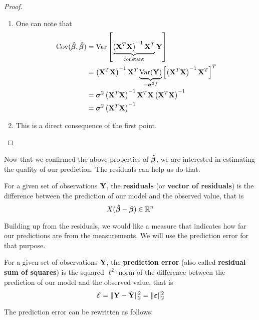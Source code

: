 \begin{proof}
    \begin{enumerate}[label=(\roman*)]

        \item One can note that\begin{align*}
                  \operatorname{Cov}(\boldsymbol{\hat{\beta}}, \boldsymbol{\hat{\beta}})
                   & = \operatorname{Var} \left[ \underbrace{\left(\mathbf{X}^T \mathbf{X}\right)^{-1} \mathbf{X}^T}_{\text{constant}} \mathbf{Y}\right]                               \\
                   & = \left(\mathbf{X}^T \mathbf{X}\right)^{-1} \mathbf{X}^T \underbrace{\operatorname{Var}(\mathbf{Y})}_{= \boldsymbol{\sigma}^2 I} \left[\left( \mathbf{X}^T \mathbf{X} \right)^{-1} \mathbf{X}^T\right]^T \\
                   & = \boldsymbol{\sigma}^{2}\left(\mathbf{X}^T \mathbf{X}\right)^{-1} \mathbf{X}^T \mathbf{X}\left(\mathbf{X}^T \mathbf{X}\right)^{-1}                                                \\
                   & = \boldsymbol{\sigma}^{2}\left(\mathbf{X}^T \mathbf{X}\right)^{-1}
              \end{align*}
        \item This is a direct consequence of the first point.
    \end{enumerate}
\end{proof}

Now that we confirmed the above properties of \( \boldsymbol{\hat{\beta}} \), we are interested in estimating the quality of our prediction. The residuals can help us do that.
\begin{definition}[Residuals]
    For a given set of observations \(\mathbf{Y}\), the \textbf{residuals} (or \textbf{vector of residuals}) is the difference between the prediction of our model and the observed value, that is
    \[
        X (\boldsymbol{\hat{\beta}} - \boldsymbol{\beta}) \in \mathbb{R}^n
    \]
\end{definition}

Building up from the residuals, we would like a measure that indicates how far our predictions are from the measurements. We will use the prediction error for that purpose.

\begin{definition}
    For a given set of observations \(\mathbf{Y}\), the \textbf{prediction error} (also called \textbf{residual sum of squares}) is the squared \(\ell^2\)-norm of the difference between the prediction of our model and the observed value, that is
    \[
        \mathcal{E} = \| \mathbf{Y} - \hat{\mathbf{Y}} \|_2^2 = \| \boldsymbol{\varepsilon} \|_2^2
    \]
\end{definition}


The prediction error can be rewritten as follows:

